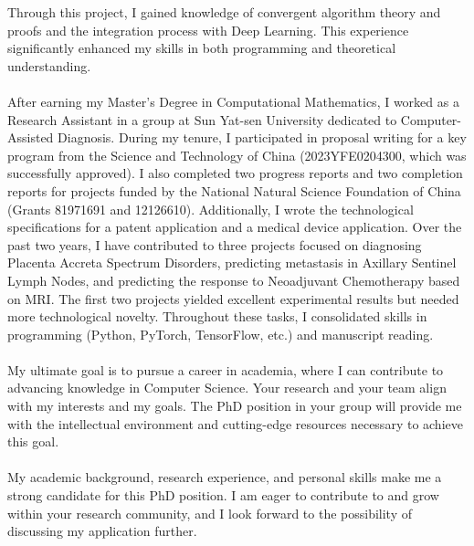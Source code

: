 \documentclass[11pt,a4paper, final]{moderncv}
\begin{document}
Through this project, I gained knowledge of convergent algorithm theory and proofs 
and the integration process with Deep Learning. 
This experience significantly enhanced my skills in both programming and theoretical understanding.
\ \\
\ \\
After earning my Master's Degree in Computational Mathematics, 
I worked as a Research Assistant in a group at Sun Yat-sen University dedicated to Computer-Assisted Diagnosis. 
During my tenure, I participated in proposal writing 
for a key program from the Science and Technology of China (2023YFE0204300, which was successfully approved). 
I also completed two progress reports and two completion reports for projects funded 
by the National Natural Science Foundation of China (Grants 81971691 and 12126610). 
Additionally, I wrote the technological specifications for a patent application and a medical device application. 
Over the past two years, I have contributed to three projects focused on 
diagnosing Placenta Accreta Spectrum Disorders, 
predicting metastasis in Axillary Sentinel Lymph Nodes, 
and predicting the response to Neoadjuvant Chemotherapy based on MRI. 
The first two projects yielded excellent experimental results but needed more technological novelty. 
Throughout these tasks, I consolidated skills in programming (Python, PyTorch, TensorFlow, etc.) and manuscript reading.
\ \\
\ \\
My ultimate goal is to pursue a career in academia, where I can contribute to advancing knowledge in Computer Science. 
Your research and your team align with my interests and my goals. 
The PhD position in your group will provide me with 
the intellectual environment and cutting-edge resources necessary to achieve this goal.
\ \\
\ \\
My academic background, research experience, 
and personal skills make me a strong candidate for this PhD position. 
I am eager to contribute to and grow within your research community, 
and I look forward to the possibility of discussing my application further.

\makeletterclosing
\end{document}
